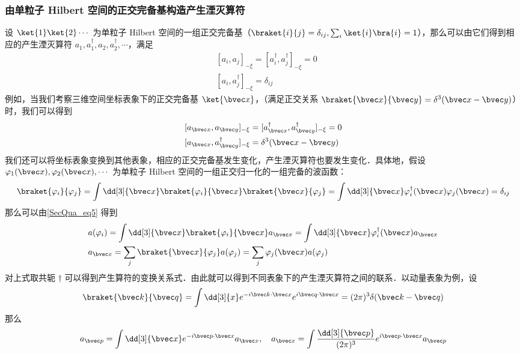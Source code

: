 \subsubsection{由单粒子 Hilbert 空间的正交完备基构造产生湮灭算符}
设 $\ket{1}\ket{2}\cdots$ 为单粒子 Hilbert 空间的一组正交完备基（$\braket{i}{j}=\delta_{ij},\sum_i\ket{i}\bra{i}=1$），那么可以由它们得到相应的产生湮灭算符 $a_1,a^\dagger_1,a_2,a^\dagger_2,\cdots$，满足
\begin{equation}
\begin{aligned}
&[a_i,a_j]_{-\xi}=[a_i^\dagger,a_j^\dagger]_{-\xi}=0\\
&[a_i,a_j^\dagger]_{-\xi}=\delta_{ij}
\end{aligned}
\end{equation}
例如，当我们考察三维空间坐标表象下的正交完备基 $\ket{\bvec x}$，（满足正交关系 $\braket{\bvec x}{\bvec y}=\delta^3(\bvec x-\bvec y)$）时，我们可以得到
\begin{equation}
\begin{aligned}
&[a_{\bvec x},a_{\bvec y}]_{-\xi}=[a_{\bvec x}^\dagger,a_{\bvec y}^\dagger]_{-\xi}=0\\
&[a_{\bvec x},a_{\bvec y}^\dagger]_{-\xi}=\delta^3(\bvec x-\bvec y)
\end{aligned}
\end{equation}
我们还可以将坐标表象变换到其他表象，相应的正交完备基发生变化，产生湮灭算符也要发生变化．具体地，假设 $\varphi_1(\bvec x),\varphi_2(\bvec x),\cdots$ 为单粒子 Hilbert 空间的一组正交归一化的一组完备的波函数：
\begin{equation}
\braket{\varphi_i}{\varphi_j}=\int \dd[3]{\bvec x}\braket{\varphi_i}{\bvec x}\braket{\bvec x}{\varphi_j}=\int \dd[3]{\bvec x} \varphi_i^\dagger(\bvec x)\varphi_j(\bvec x) =\delta_{ij} 
\end{equation}
那么可以由\autoref{SecQua_eq5} 得到
\begin{equation}
\begin{aligned}
&a(\varphi_i) = \int \dd[3]{\bvec x} \braket{\varphi_i}{\bvec x} a_{\bvec x}=\int \dd[3]{\bvec x} \varphi_i^\dagger(\bvec x) a_{\bvec x}\\
&a_{\bvec x} = \sum_j \braket{\bvec x}{\varphi_j} a(\varphi_j) = \sum_j \varphi_j(\bvec x)a(\varphi_j)
\end{aligned}
\end{equation}
对上式取共轭 $\dagger$ 可以得到产生算符的变换关系式．由此就可以得到不同表象下的产生湮灭算符之间的联系．以动量表象为例，设
\begin{equation}
\braket{\bvec k}{\bvec q}=\int \dd[3]{x} e^{-i\bvec k\cdot \bvec x} e^{i\bvec q\cdot \bvec x} = (2\pi)^3 \delta(\bvec k-\bvec q)
\end{equation}
那么
\begin{equation}
a_{\bvec p}=\int \dd[3]{\bvec x} e^{-i\bvec p\cdot \bvec x} a_{\bvec x},\quad a_{\bvec x}=\int \frac{\dd[3]{\bvec p}}{(2\pi)^3}e^{i\bvec p\cdot \bvec x}a_{\bvec p}
\end{equation}

